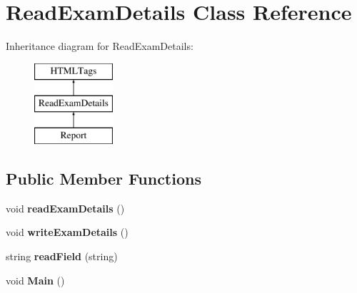 \hypertarget{classReadExamDetails}{\section{Read\-Exam\-Details Class Reference}
\label{classReadExamDetails}
}
Inheritance diagram for Read\-Exam\-Details\-:\begin{figure}[H]
\begin{center}
\leavevmode
\includegraphics[height=3.000000cm]{classReadExamDetails}
\end{center}
\end{figure}
\subsection*{Public Member Functions}
\begin{DoxyCompactItemize}
\item 
\hypertarget{classReadExamDetails_a419ea4ab2644a1c517f389b726408384}{void {\bfseries read\-Exam\-Details} ()}\label{classReadExamDetails_a419ea4ab2644a1c517f389b726408384}

\item 
\hypertarget{classReadExamDetails_a25941733e41fec97688c730711768a56}{void {\bfseries write\-Exam\-Details} ()}\label{classReadExamDetails_a25941733e41fec97688c730711768a56}

\item 
\hypertarget{classReadExamDetails_a67581721d40087cb5f87000654f02731}{string {\bfseries read\-Field} (string)}\label{classReadExamDetails_a67581721d40087cb5f87000654f02731}

\item 
\hypertarget{classReadExamDetails_a83761c8c6a10b7198054a723b53af9fb}{void {\bfseries Main} ()}\label{classReadExamDetails_a83761c8c6a10b7198054a723b53af9fb}

\end{DoxyCompactItemize}
